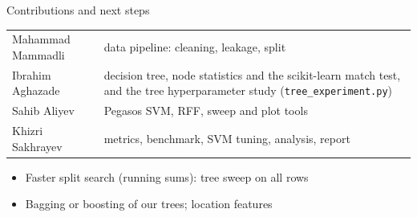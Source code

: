 \documentclass[14pt,aspectratio=169]{beamer}
\newcommand{\gap}{\setlength{\itemsep}{0.45em}}
\begin{document}
\begin{frame}{Contributions and next steps}
  \begin{tabular}{@{}l@{\quad}>{\raggedright\arraybackslash}p{}@{}}
    Mahammad Mammadli & data pipeline: cleaning, leakage, split \\
    Ibrahim Aghazade  & decision tree, node statistics and the scikit-learn match test, and the tree hyperparameter study (\texttt{tree\_experiment.py}) \\
    Sahib Aliyev      & Pegasos SVM, RFF, sweep and plot tools \\
    Khizri Sakhrayev  & metrics, benchmark, SVM tuning, analysis, report \\
  \end{tabular}
  \vspace{0.4em}
  \begin{itemize}\gap
    \item Faster split search (running sums): tree sweep on all rows
    \item Bagging or boosting of our trees; location features
  \end{itemize}
\end{frame}
\end{document}
